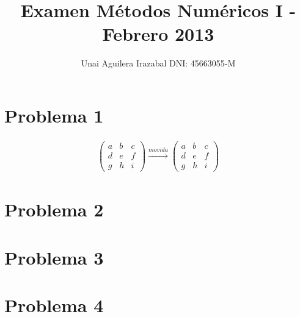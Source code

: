 \documentclass[a4paper, 12pt]{article}
\title{Examen Métodos Numéricos I - Febrero 2013}
\author{Unai Aguilera Irazabal DNI: 45663055-M}
\begin{document}
\maketitle

\section*{Problema 1}

\begin{align*}
\begin{pmatrix}
  a & b & c \\
  d & e & f \\
  g & h & i
\end{pmatrix} 
\xrightarrow{movida}
\begin{pmatrix}
  a & b & c \\
  d & e & f \\
  g & h & i
\end{pmatrix}
\end{align*}

\section*{Problema 2}

\section*{Problema 3}

\section*{Problema 4}
\end{document}
